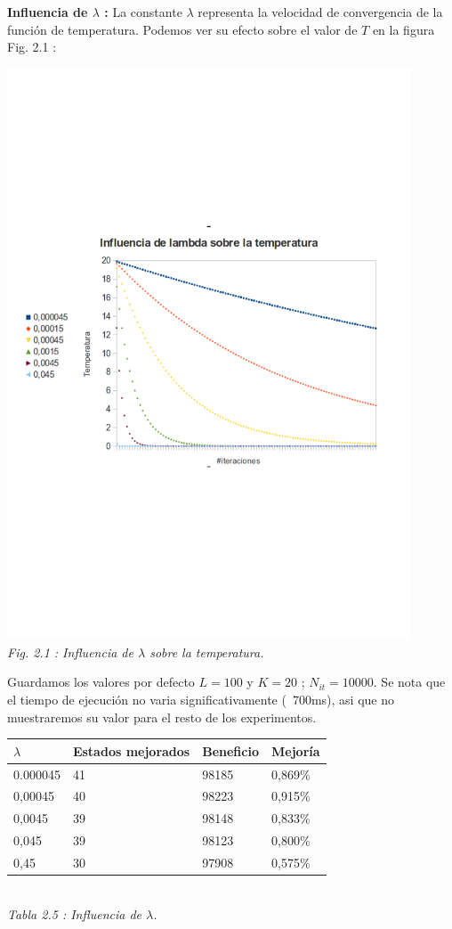 \documentclass{article}
\begin{document}
\textbf{Influencia de $\lambda$ : }
La constante $\lambda$ representa la velocidad de convergencia de la función de
temperatura. Podemos ver su efecto sobre el valor de $T$ en la figura Fig. 2.1 :
\begin{center}
\includegraphics[width=12cm]{cordero}\\
{\it Fig. 2.1 : Influencia de $\lambda$ sobre la temperatura.}
\end{center}

Guardamos los valores por defecto $L=100$ y $K=20$ ; $N_{it} = 10 000$.
Se nota que el tiempo de ejecución no varia significativamente (~700ms), asi que
no muestraremos su valor para el resto de los experimentos.\\

\begin{center}
\begin{tabular}{|l||l|l|l|}
\hline
$\lambda$ & Estados mejorados & Beneficio & Mejoría\\
\hline
0.000045 & 41 & 98185 & 0,869\%\\
\hline
0,00045 & 40 & 98223 & 0,915\%\\
\hline
0,0045 & 39 & 98148 & 0,833\%\\
\hline
0,045 & 39 & 98123 & 0,800\%\\
\hline
0,45 & 30 & 97908 & 0,575\%\\
\hline
\end{tabular}\\
{\it Tabla 2.5 : Influencia de $\lambda$.}
\end{center}
\end{document}

